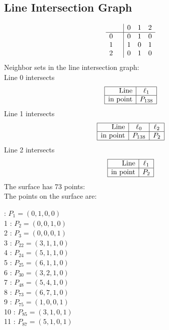 \documentclass{article}
\begin{document}
{\subsection*{Line Intersection Graph}
{\arraycolsep=1pt
$$
\begin{array}{rr|*{3}r}
 &  & 0 & 1 & 2\\
\hline
0 &  & 0 & 1 & 0\\
1 &  & 1 & 0 & 1\\
2 &  & 0 & 1 & 0\\
\end{array}
$$
}%
Neighbor sets in the line intersection graph:\\
Line 0 intersects 
$$
\begin{array}{|r*{1}{|c}|}
\hline
\mbox{Line}  & \ell_{1}\\
\hline
\mbox{in point}  & P_{138}\\
\hline
\end{array}
$$
Line 1 intersects 
$$
\begin{array}{|r*{2}{|c}|}
\hline
\mbox{Line}  & \ell_{0} & \ell_{2}\\
\hline
\mbox{in point}  & P_{138} & P_{2}\\
\hline
\end{array}
$$
Line 2 intersects 
$$
\begin{array}{|r*{1}{|c}|}
\hline
\mbox{Line}  & \ell_{1}\\
\hline
\mbox{in point}  & P_{2}\\
\hline
\end{array}
$$
The surface has 73 points:\\
The points on the surface are:\\
\begin{multicols}{3}
 : $P_{1}=( 0, 1, 0, 0 )$\\
1 : $P_{2}=( 0, 0, 1, 0 )$\\
2 : $P_{3}=( 0, 0, 0, 1 )$\\
3 : $P_{22}=( 3, 1, 1, 0 )$\\
4 : $P_{24}=( 5, 1, 1, 0 )$\\
5 : $P_{25}=( 6, 1, 1, 0 )$\\
6 : $P_{30}=( 3, 2, 1, 0 )$\\
7 : $P_{48}=( 5, 4, 1, 0 )$\\
8 : $P_{73}=( 6, 7, 1, 0 )$\\
9 : $P_{75}=( 1, 0, 0, 1 )$\\
10 : $P_{85}=( 3, 1, 0, 1 )$\\
11 : $P_{87}=( 5, 1, 0, 1 )$\\

\end{multicols}}
\end{document}
